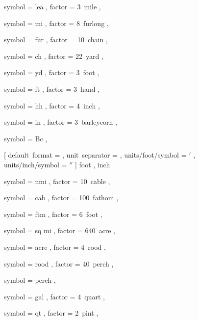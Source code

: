 
 {
	symbol = { lea } ,
	factor = { 3~mile } ,
}

 {
	symbol = { mi } ,
	factor = { 8~furlong } ,
}

 {
	symbol = { fur } ,
	factor = { 10~chain } ,
}

 {
	symbol = { ch } ,
	factor = { 22~yard } ,
}

 {
	symbol = { yd } ,
	factor = { 3~foot } ,
}

 {
	symbol = { ft } ,
	factor = { 3~hand } ,
}

 {
	symbol = { hh } ,
	factor = { 4~inch } ,
}

 {
	symbol = { in } ,
	factor = { 3~barleycorn } ,
}

 {
	symbol = { Bc } ,
}


 [
	default~format = {\VALUE\SYMBOL} ,
	unit~separator = {} ,
	units/foot/symbol = {  $'$ } ,
	units/inch/symbol = { $''$ }
] {
	foot ,
	inch
}


 {
	symbol = { nmi } ,
	factor = { 10~cable } ,
}

 {
	symbol = { cab } ,
	factor = { 100~fathom } ,
}

 {
	symbol = { ftm } ,
	factor = { 6~foot } ,
}


 {
	symbol = { sq mi } ,
	factor = { 640~acre } ,
}

 {
	symbol = { acre } ,
	factor = { 4~rood } ,
}

 {
	symbol = { rood } ,
	factor = { 40~perch } ,
}

 {
	symbol = { perch } ,
}


 {
	symbol = { gal } ,
	factor = { 4~quart } ,
}

 {
	symbol = { qt } ,
	factor = { 2~pint } ,
}


